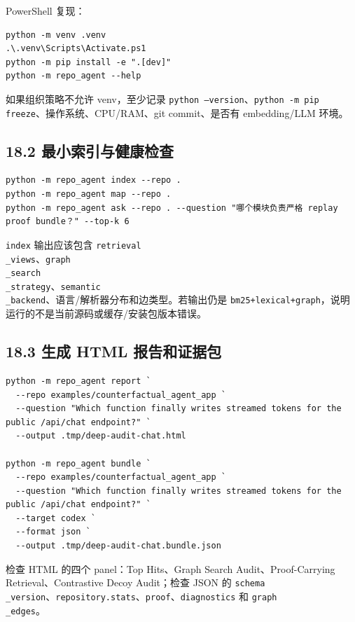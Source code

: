 \documentclass[UTF8,12pt,openany]{ctexbook}
\begin{document}
PowerShell 复现：\par

\begin{lstlisting}
python -m venv .venv
.\.venv\Scripts\Activate.ps1
python -m pip install -e ".[dev]"
python -m repo_agent --help
\end{lstlisting}

如果组织策略不允许 venv，至少记录 \texttt{python --version}、\texttt{python -m pip freeze}、操作系统、CPU/RAM、git commit、是否有 embedding/LLM 环境。\par

\subsection{18.2 最小索引与健康检查}

\begin{lstlisting}
python -m repo_agent index --repo .
python -m repo_agent map --repo .
python -m repo_agent ask --repo . --question "哪个模块负责严格 replay proof bundle？" --top-k 6
\end{lstlisting}

\texttt{index} 输出应该包含 \texttt{retrieval\\_views}、\texttt{graph\\_search\\_strategy}、\texttt{semantic\\_backend}、语言/解析器分布和边类型。若输出仍是 \texttt{bm25+lexical+graph}，说明运行的不是当前源码或缓存/安装包版本错误。\par

\subsection{18.3 生成 HTML 报告和证据包}

\begin{lstlisting}
python -m repo_agent report `
  --repo examples/counterfactual_agent_app `
  --question "Which function finally writes streamed tokens for the public /api/chat endpoint?" `
  --output .tmp/deep-audit-chat.html

python -m repo_agent bundle `
  --repo examples/counterfactual_agent_app `
  --question "Which function finally writes streamed tokens for the public /api/chat endpoint?" `
  --target codex `
  --format json `
  --output .tmp/deep-audit-chat.bundle.json
\end{lstlisting}

检查 HTML 的四个 panel：Top Hits、Graph Search Audit、Proof-Carrying Retrieval、Contrastive Decoy Audit；检查 JSON 的 \texttt{schema\\_version}、\texttt{repository.stats}、\texttt{proof}、\texttt{diagnostics} 和 \texttt{graph\\_edges}。\par
\end{document}

